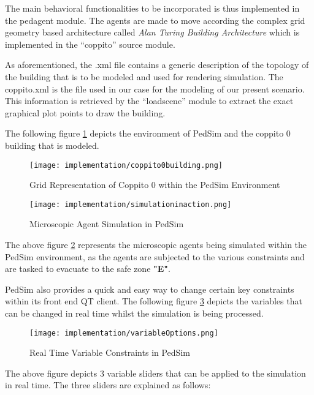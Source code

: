 The main behavioral functionalities to be incorporated is thus implemented in the ped\textunderscore agent module. The agents are made to move according the complex grid geometry based architecture called \textit{Alan Turing Building Architecture} which is implemented in the “coppito” source module.

As aforementioned, the .xml file contains a generic description of the topology of the building that is to be modeled and used for rendering simulation. The coppito.xml is the file used in our case for the modeling of our present scenario. This information is retrieved by the “loadscene” module to extract the exact graphical plot points to draw the building. 

The following figure \ref{coppito_pedsim} depicts the environment of PedSim and the coppito 0 building that is modeled. 

\begin{figure}[H]
  \centering
  \texttt{[image: implementation/coppito0building.png]}
  \caption{Grid Representation of Coppito 0 within the PedSim Environment}
  \label{coppito_pedsim}
\end{figure}

\begin{figure}[H]
  \centering
  \texttt{[image: implementation/simulationinaction.png]}
  \caption{Microscopic Agent Simulation in PedSim}
  \label{coppito_simulation}
\end{figure}

The above figure \ref{coppito_simulation} represents the microscopic agents being simulated within the PedSim environment, as the agents are subjected to the various constraints and are tasked to evacuate to the safe zone \textbf{"E"}.

PedSim also provides a quick and easy way to change certain key constraints within its front end QT client. The following figure \ref{variableOptions} depicts the variables that can be changed in real time whilst the simulation is being processed.

\begin{figure}[H]
  \centering
  \texttt{[image: implementation/variableOptions.png]}
  \caption{Real Time Variable Constraints in PedSim}
  \label{variableOptions}
\end{figure}

The above figure depicts 3 variable sliders that can be applied to the simulation in real time. The three sliders are explained as follows:


